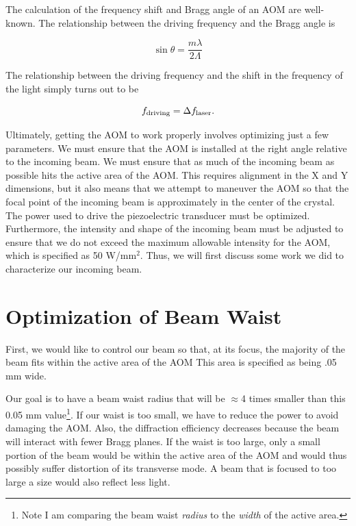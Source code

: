 The calculation of the frequency shift and Bragg angle of an AOM are well-known. The relationship between the driving frequency and the Bragg angle is 


\begin{equation}
\sin{\theta}=\frac{m \lambda}{2 \Lambda}
\end{equation}

The relationship between the driving frequency and the shift in the frequency of the light simply turns out to be 

\begin{equation}
    f_{\textnormal{driving}}=\Delta f_{\textnormal{laser}}.
\end{equation}

Ultimately, getting the AOM to work properly involves optimizing just a few parameters. We must ensure that the AOM is installed at the right angle relative to the incoming beam. We must ensure that as much of the incoming beam as possible hits the active area of the AOM. This requires alignment in the X and Y dimensions, but it also means that we attempt to maneuver the AOM so that the focal point of the incoming beam is approximately in the center of the crystal. The power used to drive the piezoelectric transducer must be optimized. Furthermore, the intensity and shape of the incoming beam must be adjusted to ensure that we do not exceed the maximum allowable intensity for the AOM, which is specified as 50 W/mm$^2$.
Thus, we will first discuss some work we did to characterize our incoming beam.

\section{Optimization of Beam Waist}
First, we would like to control our beam so that, at its focus, the majority of the beam fits within the active area of the AOM 
This area is specified as being .05 mm wide. 

Our goal is to have a beam waist radius that will be $\approx$4 times smaller than this 0.05 mm value\footnote{Note I am comparing the beam waist \emph{radius} to the \emph{width} of the active area.}. If our waist is too small, we have to reduce the power to avoid damaging the AOM. Also, the diffraction efficiency decreases because the beam will interact with fewer Bragg planes. If the waist is too large, only a small portion of the beam would be within the active area of the AOM and would thus possibly suffer distortion of its transverse mode. A beam that is focused to too large a size would also reflect less light.

